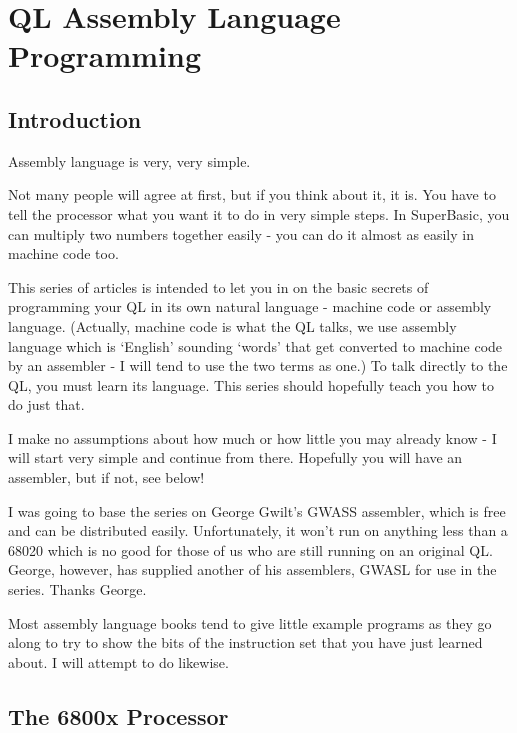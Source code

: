 \chapter{QL Assembly Language Programming}

\section{Introduction}
\label{ch1-intro}%

Assembly language is very, very simple.

Not many people will agree at first, but if you think about it, it
    is. You have to tell the processor what you want it to do in very simple
    steps. In SuperBasic, you can multiply two numbers together easily -{} you
    can do it almost as easily in machine code too.

This series of articles is intended to let you in on the basic
    secrets of programming your QL in its own natural language -{} machine code
    or assembly language. (Actually, machine code is what the QL talks, we use
    assembly language which is `English' sounding `words' that get converted
    to machine code by an assembler -{} I will tend to use the two terms as
    one.) To talk directly to the QL, you must learn its language. This series
    should hopefully teach you how to do just that.

I make no assumptions about how much or how little you may already
    know -{} I will start very simple and continue from there. Hopefully you
    will have an assembler, but if not, see below!

I was going to base the series on George Gwilt's
 GWASS assembler, which is free and can be
    distributed easily. Unfortunately, it won't run on anything less than a
    68020 which is no good for those of us who are still running on an
    original QL. George, however, has supplied another of his assemblers, 
 GWASL for use in the series. Thanks George.

Most assembly language books tend to give little example programs as
    they go along to try to show the bits of the instruction set that you have
    just learned about. I will attempt to do likewise.

\section{The 6800x Processor}
\label{ch1-6800x}%

